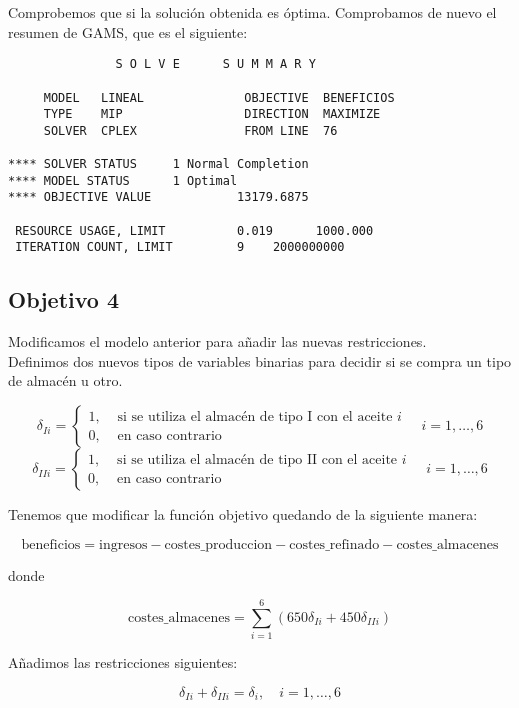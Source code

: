\documentclass[12pt,a4paper,twoside,openright,titlepage,final]{article}
\begin{document}
Comprobemos que si la solución obtenida es óptima. Comprobamos de nuevo el resumen de GAMS, que es el siguiente:

\begin{verbatim}
               S O L V E      S U M M A R Y

     MODEL   LINEAL              OBJECTIVE  BENEFICIOS
     TYPE    MIP                 DIRECTION  MAXIMIZE
     SOLVER  CPLEX               FROM LINE  76

**** SOLVER STATUS     1 Normal Completion         
**** MODEL STATUS      1 Optimal                   
**** OBJECTIVE VALUE            13179.6875

 RESOURCE USAGE, LIMIT          0.019      1000.000
 ITERATION COUNT, LIMIT         9    2000000000
\end{verbatim}

\subsection{Objetivo 4}

Modificamos el modelo anterior para añadir las nuevas restricciones.\\

Definimos dos nuevos tipos de variables binarias para decidir si se compra un tipo de almacén u otro.

\[ \delta_{Ii} = \begin{cases}
1, & \text{ si se utiliza el almacén de tipo I con el aceite } i\\
0, & \text{ en caso contrario}
\end{cases} \quad i = 1,\dots,6\]
\[\delta_{IIi} = \begin{cases}
1, & \text{ si se utiliza el almacén de tipo II con el aceite } i\\
0, & \text{ en caso contrario}
\end{cases} \quad i = 1,\dots,6\]

Tenemos que modificar la función objetivo quedando de la siguiente manera:

\[ \text{beneficios} = \text{ingresos} - \text{costes\_produccion} - \text{costes\_refinado} - \text{costes\_almacenes} \]

donde 

\[ \text{costes\_almacenes} = \sum_{i=1}^{6} (650\delta_{Ii} + 450\delta_{IIi}) \]

Añadimos las restricciones siguientes:

\[ \delta_{Ii} + \delta_{IIi} = \delta_i, \quad i = 1,\dots, 6 \]
\end{document}
